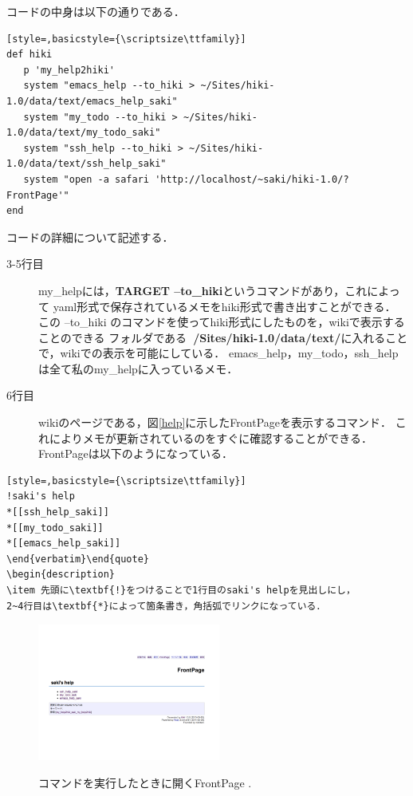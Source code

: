 コードの中身は以下の通りである．
\begin{lstlisting}[style=,basicstyle={\scriptsize\ttfamily}]
def hiki
   p 'my_help2hiki'
   system "emacs_help --to_hiki > ~/Sites/hiki-1.0/data/text/emacs_help_saki"
   system "my_todo --to_hiki > ~/Sites/hiki-1.0/data/text/my_todo_saki"
   system "ssh_help --to_hiki > ~/Sites/hiki-1.0/data/text/ssh_help_saki"
   system "open -a safari 'http://localhost/~saki/hiki-1.0/?FrontPage'"
end
\end{lstlisting}

コードの詳細について記述する．
\begin{description}
\item[3-5行目]
my\_helpには，\textbf{TARGET --to\_hiki}というコマンドがあり，これによって
yaml形式で保存されているメモをhiki形式で書き出すことができる．
この --to\_hiki のコマンドを使ってhiki形式にしたものを，wikiで表示することのできる
フォルダである\textbf{~/Sites/hiki-1.0/data/text/}に入れることで，wikiでの表示を可能にしている．
emacs\_help，my\_todo，ssh\_helpは全て私のmy\_helpに入っているメモ．
\end{description}

\begin{description}
\item[6行目]
wikiのページである，図\ref{help}に示したFrontPageを表示するコマンド．
これによりメモが更新されているのをすぐに確認することができる．
FrontPageは以下のようになっている．
\end{description}

\begin{lstlisting}[style=,basicstyle={\scriptsize\ttfamily}]
!saki's help
*[[ssh_help_saki]]
*[[my_todo_saki]]
*[[emacs_help_saki]]
\end{verbatim}\end{quote}
\begin{description}
\item 先頭に\textbf{!}をつけることで1行目のsaki's helpを見出しにし，
2~4行目は\textbf{*}によって箇条書き，角括弧でリンクになっている．
\end{lstlisting}

\begin{figure}[htbp]\begin{center}
\includegraphics[clip,width=6cm,bb=100 100 600 550]{my_help2hiki_saki.002.png}
\caption{コマンドを実行したときに開くFrontPage .}\label{help}
\label{default}\end{center}\end{figure}

